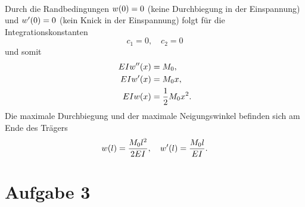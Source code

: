 \documentclass{exercise}
\begin{document}
\begin{itemize}
\begin{align*}
        \end{align*}
        Durch die Randbedingungen \(w\parentheses*{0} = 0\) (keine Durchbiegung in der Einspannung) und \(w'\parentheses*{0} = 0\) (kein Knick in der Einspannung) folgt für die Integrationskonstanten
        \[
            c_1 = 0, \quad c_2 = 0
        \]
        und somit
        \begin{align*}
            EIw''\parentheses*{x} &= M_0,\\
            EIw'\parentheses*{x} &= M_0 x,\\
            EIw\parentheses*{x} &= \frac{1}{2}M_0 x^2.
        \end{align*}
        Die maximale Durchbiegung und der maximale Neigungswinkel befinden sich am Ende des Trägers
        \[
            w\parentheses*{l} = \frac{M_0 l^2}{2EI}, \quad w'\parentheses*{l} = \frac{M_0 l}{EI}.
        \]
    \end{itemize}
    
    
    \section*{Aufgabe 3}
    
\end{document}
